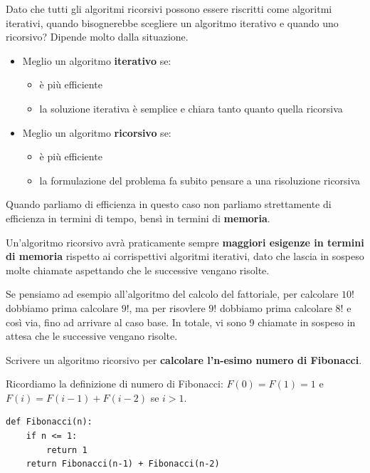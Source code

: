 \documentclass[11pt, a4paper, titlepage, oneside]{scrbook}
\begin{document}
Dato che tutti gli algoritmi ricorsivi possono essere riscritti come algoritmi iterativi, quando bisognerebbe scegliere un algoritmo iterativo e quando uno ricorsivo? Dipende molto dalla situazione.
\begin{itemize}
    \item Meglio un algoritmo \textbf{iterativo} se:
    \begin{itemize}
        \item è più efficiente
        \item la soluzione iterativa è semplice e chiara tanto quanto quella ricorsiva 
    \end{itemize}
    \item Meglio un algoritmo \textbf{ricorsivo} se:
    \begin{itemize}
        \item è più efficiente
        \item la formulazione del problema fa subito pensare a una risoluzione ricorsiva
    \end{itemize}
\end{itemize}

Quando parliamo di efficienza in questo caso non parliamo strettamente di efficienza in termini di tempo, bensì in termini di \textbf{memoria}.

\begin{Definizione}
\label{def-esigenze-di-memroia}
Un'algoritmo ricorsivo avrà praticamente sempre \textbf{maggiori esigenze in termini di memoria} rispetto ai corrispettivi algoritmi iterativi, dato che lascia in sospeso molte chiamate aspettando che le successive vengano risolte.
\end{Definizione}

Se pensiamo ad esempio all'algoritmo del calcolo del fattoriale, per calcolare $10!$ dobbiamo prima calcolare $9!$, ma per risovlere $9!$ dobbiamo prima calcolare $8!$ e così via, fino ad arrivare al caso base. In totale, vi sono 9 chiamate in sospeso in attesa che le successive vengano risolte.

\Esempi \nopagebreak

Scrivere un algoritmo ricorsivo per \textbf{calcolare l'n-esimo numero di Fibonacci}. \nopagebreak

Ricordiamo la definizione di numero di Fibonacci: $F(0) = F(1) = 1$ e $F(i) = F(i-1) + F(i-2)$ se $i > 1$. 

\begin{lstlisting}[style=Python]
def Fibonacci(n):
    if n <= 1:
        return 1
    return Fibonacci(n-1) + Fibonacci(n-2)
\end{lstlisting}
\end{document}
